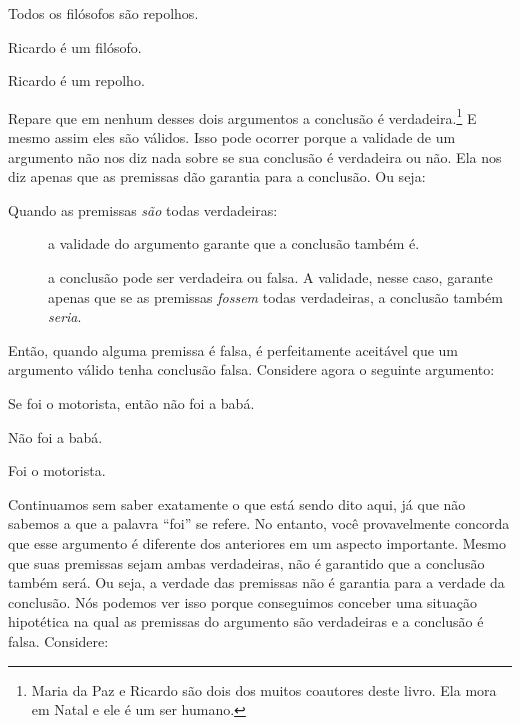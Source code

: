 \begin{earg}
	\item[] Todos os filósofos são repolhos.
	\item[] Ricardo é um filósofo.
	\item[\therefore] Ricardo é um repolho.
\end{earg}
Repare que em nenhum desses dois argumentos a conclusão é verdadeira.\footnote{
	Maria da Paz e Ricardo são dois dos muitos coautores deste livro. Ela mora em Natal e ele é um ser humano.}
E mesmo assim eles são válidos.
Isso pode ocorrer porque a validade de um argumento não nos diz nada sobre se sua conclusão é verdadeira ou não. 
Ela nos diz apenas que as premissas dão garantia para a conclusão.
Ou seja:
\begin{description}
	\item[Quando as premissas \textit{são} todas verdadeiras:] a validade do argumento garante que a conclusão também é.
	\item[] a conclusão pode ser verdadeira ou falsa.
	A validade, nesse caso, garante apenas que se as premissas \textit{fossem} todas verdadeiras, a conclusão também \textit{seria}.
\end{description}
Então, quando alguma premissa é falsa, é perfeitamente aceitável que um argumento válido tenha conclusão falsa.
Considere agora o seguinte argumento:
\begin{earg}
	\item[] Se foi o motorista, então não foi a babá.
	\item[] Não foi a babá.
	\item[\therefore] Foi o motorista.
    \label{argMaidDriver}
\end{earg}
Continuamos sem saber exatamente o que está sendo dito aqui, já que não sabemos a que a palavra ``foi'' se refere.
No entanto, você provavelmente concorda que esse argumento é diferente dos anteriores em um aspecto importante.
Mesmo que suas premissas sejam ambas verdadeiras, não é garantido que a conclusão também será.
Ou seja, a verdade das premissas não é garantia para a verdade da conclusão.
Nós podemos ver isso porque conseguimos conceber uma situação hipotética na qual as premissas do argumento são verdadeiras e a conclusão é falsa.
Considere:

